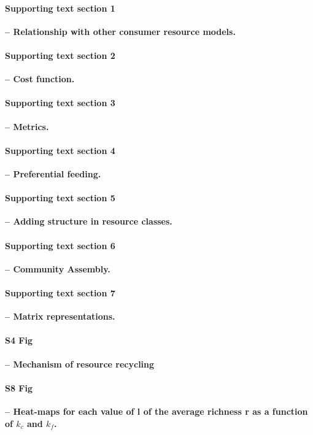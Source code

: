 \documentclass[10pt,letterpaper]{article}
\begin{document}

\paragraph*{Supporting text section 1}\textbf{--  Relationship with other consumer resource models.}
\label{S1_equivalence}
\paragraph*{Supporting text section 2}\textbf{--  Cost function.}
\label{S2_cost}
\paragraph*{Supporting text section 3}\textbf{--  Metrics.}
\label{S3_metrics}
\paragraph*{Supporting text section 4}\textbf{--  Preferential feeding.}
\label{S5_preferential}
\paragraph*{Supporting text section 5}\textbf{--  Adding structure in resource classes.}
\label{S6_classes}
\paragraph*{Supporting text section 6}\textbf{--  Community Assembly.}
\label{S7_assembly}
\paragraph*{Supporting text section 7}\textbf{--  Matrix representations.}
\label{S4_matrices}
\paragraph*{S4 Fig}\textbf{--  Mechanism of resource recycling}
\label{S4Fig}
\paragraph*{S8 Fig}\textbf{--  Heat-maps for each value of l of the average richness r as a function of $k_c$ and $k_f$.}
\label{S8_Fig}
\end{document}
